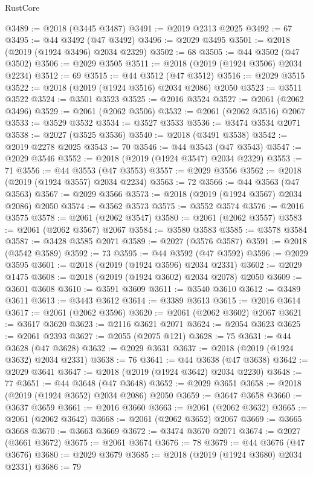 \begin{lexlean}{RustCore}
\begin{coremodule}
@3489 := @2018 (@3445 @3487)
@3491 := @2019 @2313 @2025
@3492 := 67
@3495 := @44 @3492 (@47 @3492)
@3496 := @2029 @3495
@3501 := @2018 (@2019 (@1924 @3496) @2034 @2329)
@3502 := 68
@3505 := @44 @3502 (@47 @3502)
@3506 := @2029 @3505
@3511 := @2018 (@2019 (@1924 @3506) @2034 @2234)
@3512 := 69
@3515 := @44 @3512 (@47 @3512)
@3516 := @2029 @3515
@3522 := @2018 (@2019 (@1924 @3516) @2034 @2086) @2050
@3523 := @3511 @3522
@3524 := @3501 @3523
@3525 := @2016 @3524
@3527 := @2061 (@2062 @3496)
@3529 := @2061 (@2062 @3506)
@3532 := @2061 (@2062 @3516) @2067
@3533 := @3529 @3532
@3534 := @3527 @3533
@3536 := @3474 @3534 @2071
@3538 := @2027 (@3525 @3536)
@3540 := @2018 (@3491 @3538)
@3542 := @2019 @2278 @2025
@3543 := 70
@3546 := @44 @3543 (@47 @3543)
@3547 := @2029 @3546
@3552 := @2018 (@2019 (@1924 @3547) @2034 @2329)
@3553 := 71
@3556 := @44 @3553 (@47 @3553)
@3557 := @2029 @3556
@3562 := @2018 (@2019 (@1924 @3557) @2034 @2234)
@3563 := 72
@3566 := @44 @3563 (@47 @3563)
@3567 := @2029 @3566
@3573 := @2018 (@2019 (@1924 @3567) @2034 @2086) @2050
@3574 := @3562 @3573
@3575 := @3552 @3574
@3576 := @2016 @3575
@3578 := @2061 (@2062 @3547)
@3580 := @2061 (@2062 @3557)
@3583 := @2061 (@2062 @3567) @2067
@3584 := @3580 @3583
@3585 := @3578 @3584
@3587 := @3428 @3585 @2071
@3589 := @2027 (@3576 @3587)
@3591 := @2018 (@3542 @3589)
@3592 := 73
@3595 := @44 @3592 (@47 @3592)
@3596 := @2029 @3595
@3601 := @2018 (@2019 (@1924 @3596) @2034 @2331)
@3602 := @2029 @1475
@3608 := @2018 (@2019 (@1924 @3602) @2034 @2078) @2050
@3609 := @3601 @3608
@3610 := @3591 @3609
@3611 := @3540 @3610
@3612 := @3489 @3611
@3613 := @3443 @3612
@3614 := @3389 @3613
@3615 := @2016 @3614
@3617 := @2061 (@2062 @3596)
@3620 := @2061 (@2062 @3602) @2067
@3621 := @3617 @3620
@3623 := @2116 @3621 @2071
@3624 := @2054 @3623
@3625 := @2061 @2393
@3627 := @2055 (@2075 @121)
@3628 := 75
@3631 := @44 @3628 (@47 @3628)
@3632 := @2029 @3631
@3637 := @2018 (@2019 (@1924 @3632) @2034 @2331)
@3638 := 76
@3641 := @44 @3638 (@47 @3638)
@3642 := @2029 @3641
@3647 := @2018 (@2019 (@1924 @3642) @2034 @2230)
@3648 := 77
@3651 := @44 @3648 (@47 @3648)
@3652 := @2029 @3651
@3658 := @2018 (@2019 (@1924 @3652) @2034 @2086) @2050
@3659 := @3647 @3658
@3660 := @3637 @3659
@3661 := @2016 @3660
@3663 := @2061 (@2062 @3632)
@3665 := @2061 (@2062 @3642)
@3668 := @2061 (@2062 @3652) @2067
@3669 := @3665 @3668
@3670 := @3663 @3669
@3672 := @3474 @3670 @2071
@3674 := @2027 (@3661 @3672)
@3675 := @2061 @3674
@3676 := 78
@3679 := @44 @3676 (@47 @3676)
@3680 := @2029 @3679
@3685 := @2018 (@2019 (@1924 @3680) @2034 @2331)
@3686 := 79

\end{coremodule}
\end{lexlean}
